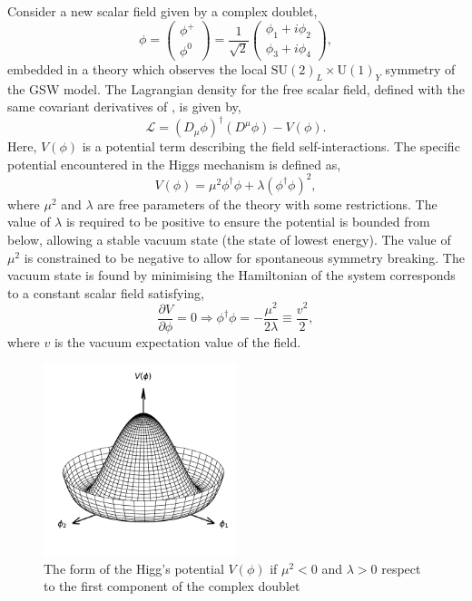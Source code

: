 Consider a new scalar field given by a complex doublet,
\begin{equation}
	\phi = \begin{pmatrix} \phi^+ \\ \phi^0 \end{pmatrix} = \frac{1}{\sqrt{2}} \begin{pmatrix} \phi_1 + i \phi_2 \\ \phi_3 + i \phi_4 \end{pmatrix},
\end{equation}
embedded in a theory which observes the local $\text{SU}(2)_L \times \text{U}(1)_Y$ symmetry of the GSW model.
The Lagrangian density for the free scalar field, defined with the same covariant derivatives of , is given by,
\begin{equation}
	\label{eq:higgs_lagrangian}
	\mathcal{L} = (D_\mu \phi)^\dagger (D^\mu \phi) - V(\phi).
\end{equation}
Here, $V(\phi)$ is a potential term describing the field self-interactions.
The specific potential encountered in the Higgs mechanism is defined as,
\begin{equation}
	\label{eq:higgs_potential}
	V(\phi) = \mu^2 \phi^\dagger \phi + \lambda (\phi^\dagger \phi)^2,
\end{equation}
where $\mu^2$ and $\lambda$ are free parameters of the theory with some restrictions.
The value of $\lambda$ is required to be positive to ensure the potential is bounded from below, allowing a stable vacuum state (the state of lowest energy).
The value of $\mu^2$ is constrained to be negative to allow for spontaneous symmetry breaking.
The vacuum state is found by minimising the Hamiltonian of the system corresponds to a constant scalar field satisfying,
\begin{equation}
	\frac{\partial V}{\partial \phi} = 0 \Longrightarrow  \phi^\dagger \phi = -\frac{\mu^2}{2\lambda} \equiv \frac{v^2}{2},
\end{equation}
where $v$ is the vacuum expectation value of the field.

\begin{figure}[h]
	\centering
	\includegraphics[width=0.5\textwidth]{Figures/standard_model/mexican_hat_potential}
	\caption{The form of the Higg's potential $V(\phi)$ if $\mu^2 < 0$ and $\lambda > 0$ respect to the first component of the complex doublet}
	\label{fig:mexican_hat}
\end{figure}

